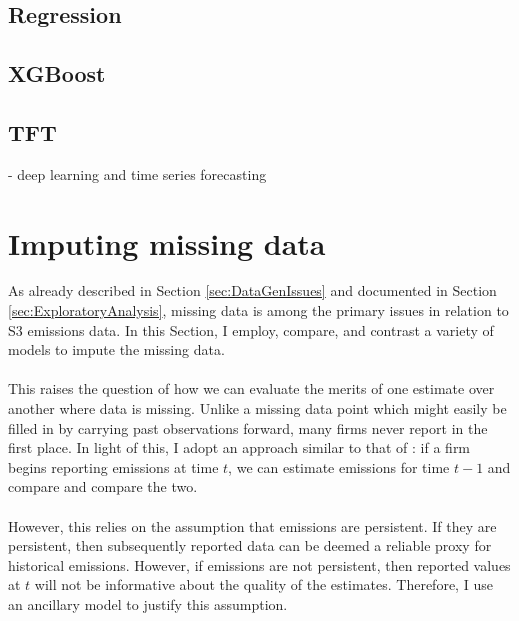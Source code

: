 \documentclass[12pt,twoside]{report}
\begin{document}
\subsection{Regression}

\subsection{XGBoost}

\subsection{TFT}
- deep learning and time series forecasting



\section{Imputing missing data}

As already described in Section \ref{sec:DataGenIssues} and documented in Section \ref{sec:ExploratoryAnalysis}, missing data is among the primary issues in relation to S3 emissions data. In this Section, I employ, compare, and contrast a variety of models to impute the missing data.
\\\\
This raises the question of how we can evaluate the merits of one estimate over another where data is missing. Unlike a missing data point which might easily be filled in by carrying past observations forward, many firms never report in the first place. In light of this, I adopt an approach similar to that of \cite{KalesnikVitali2022}: if a firm begins reporting emissions at time $t$, we can estimate emissions for time $t-1$ and compare and compare the two. 
\\\\
However, this relies on the assumption that emissions are persistent. If they are persistent, then subsequently reported data can be deemed a reliable proxy for historical emissions. However, if emissions are not persistent, then reported values at $t$ will not be informative about the quality of the estimates. Therefore, I use an ancillary model to justify this assumption.
\end{document}
